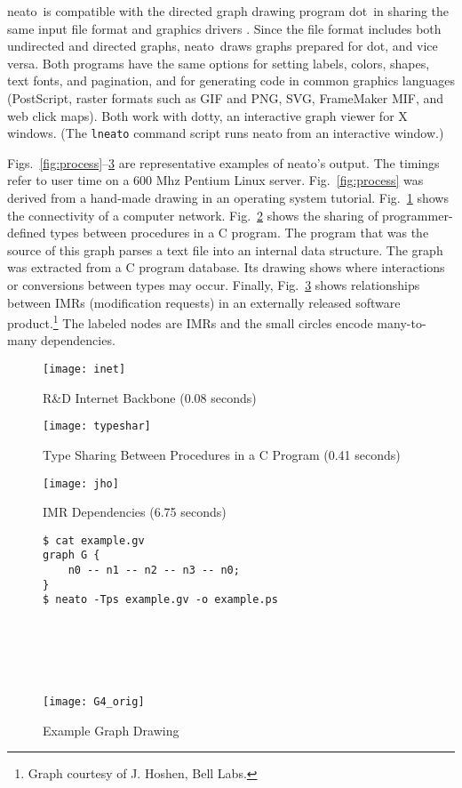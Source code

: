 \documentclass[11pt]{article}
\def\dot{{\sc dot}}
\def\dotty{{\sc dotty}}
\def\neato{{\sc neato}}
\begin{document}
\neato\ is compatible with the directed graph drawing program
\dot\ in sharing the same input file format
and graphics drivers \cite{dotuserguide}.
Since the file format includes both undirected and directed graphs,
\neato\ draws graphs prepared for \dot, and vice versa.
Both programs have the same options for setting labels, colors, shapes,
text fonts, and pagination, and for generating code in common graphics
languages (PostScript, raster formats such as GIF and PNG, SVG,
FrameMaker MIF, and web click maps).
Both work with \dotty, an interactive graph viewer for X windows.
(The {\tt lneato} command script runs neato from an interactive window.)

Figs.~\ref{fig:process}--\ref{fig:IMR} are representative 
examples of \neato's output.
The timings refer to user time on a 600 Mhz Pentium Linux server.
Fig.~\ref{fig:process} was derived from a hand-made drawing
in an operating system tutorial.
Fig.~\ref{fig:inet} shows the connectivity of a computer network.
Fig.~\ref{fig:typesharing} shows the sharing of programmer-defined types
between procedures in a C program.  The program that was the source
of this graph parses a text file into an internal data structure.
The graph was extracted from a C program database.  Its drawing shows
where interactions or conversions between types may occur.  Finally,
Fig.~\ref{fig:IMR} shows relationships between IMRs (modification requests)
in an externally released software product.\footnote{Graph
courtesy of J. Hoshen, Bell Labs.} The labeled nodes are IMRs and the small circles
encode many-to-many dependencies.
\begin{figure}[h]
	\centerline{\texttt{[image: inet]}}  %
	\vspace{.25in}
    \caption{R\&D Internet Backbone (0.08 seconds)}
    \label{fig:inet}
\end{figure}

\begin{figure}[h]
	\centerline{\texttt{[image: typeshar]}} %
    \caption{Type Sharing Between Procedures in a C Program (0.41 seconds)}
    \label{fig:typesharing}
\end{figure}
\begin{figure}[h]
	\centerline{\texttt{[image: jho]}}  %
	\caption{IMR Dependencies (6.75 seconds)}
	\label{fig:IMR}
\end{figure}
\clearpage

\begin{figure}[h]
\begin{minipage}[b]{2in}
\begin{verbatim}
$ cat example.gv
graph G {
    n0 -- n1 -- n2 -- n3 -- n0;
}
$ neato -Tps example.gv -o example.ps


\end{verbatim}
\end{minipage} \hspace{1.0in} \
\parbox[b]{2.5in}{
	\ \\
    \centerline{\texttt{[image: G4\_orig]}}
}
\caption{Example Graph Drawing}
\label{fig:G4_orig}
\end{figure}
\end{document}
